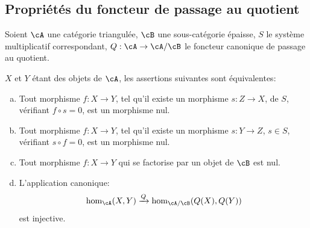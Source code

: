 \subsection{Propriétés du foncteur de passage au quotient}\label{VIII:2-5}

Soient $\cA$ une catégorie triangulée, $\cB$ une sous-catégorie épaisse, 
$S$ le système multiplicatif correspondant, $Q:\cA\to \cA/\cB$ le foncteur 
canonique de passage au quotient. 





\begin{proposition}\label{VIII:2-5-1}
$X$ et $Y$ étant des objets de $\cA$, les assertions suivantes sont 
équivalentes: 
\begin{enumerate}[(a)]
  \item Tout morphisme $f:X\to Y$, tel qu'il existe un morphisme $s:Z\to X$, de 
    $S$, vérifiant $f\circ s=0$, est un morphisme nul.
  \item Tout morphisme $f:X\to Y$, tel qu'il existe un morphisme $s:Y\to Z$, 
    $s\in S$, vérifiant $s\circ f=0$, est un morphisme nul. 
  \item {}Tout morphisme $f:X\to Y$ qui se factorise par un objet de $\cB$ est 
    nul. 
  \item L'application canonique: 
    \[
      \hom_\cA(X,Y) \xrightarrow{Q} \hom_{\cA/\cB}(Q(X),Q(Y))
    \]
    est injective. 
\end{enumerate}
\end{proposition}





